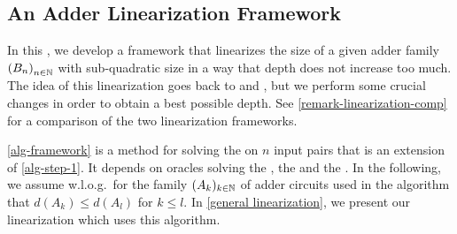 \subsection{An Adder Linearization Framework} \label{sec: linearization framework}

In this ,
we develop a framework that linearizes the size of a given adder family $\left({B_n}\right)_{n \in \mathbb N}$ with sub-quadratic size
in a way that depth does not increase too much.
The idea of this linearization goes back to \citet{Ofman63} and \citet{Khrapchenko-construction},
but we perform some crucial changes in order to obtain a best possible depth.
See \cref{remark-linearization-comp} for a comparison of the two linearization frameworks.

\cref{alg-framework} is a method for solving the \pradderopt{} on $n$ input pairs
that is an extension of \cref{alg-step-1}.
It depends on oracles solving the \pradderopt{}, the \praopdepthopt{} and the \prmultiand{}.
In the following, we assume w.l.o.g.\ for the family $(A_k)_{k \in \mathbb N}$ of adder circuits 
used in the algorithm that $d(A_k) \leq d(A_l)$ for $k \leq l$.
In \cref{general linearization}, we present our linearization which uses this algorithm.

